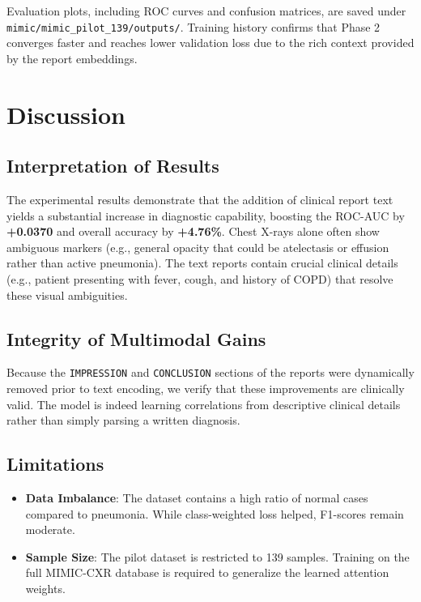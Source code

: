\documentclass[11pt,a4paper]{article}
\begin{document}
Evaluation plots, including ROC curves and confusion matrices, are saved under \texttt{mimic/mimic\_pilot\_139/outputs/}. Training history confirms that Phase 2 converges faster and reaches lower validation loss due to the rich context provided by the report embeddings.

\section{Discussion} \label{sec:discussion}

\subsection{Interpretation of Results}
The experimental results demonstrate that the addition of clinical report text yields a substantial increase in diagnostic capability, boosting the ROC-AUC by \textbf{+0.0370} and overall accuracy by \textbf{+4.76\%}. Chest X-rays alone often show ambiguous markers (e.g., general opacity that could be atelectasis or effusion rather than active pneumonia). The text reports contain crucial clinical details (e.g., patient presenting with fever, cough, and history of COPD) that resolve these visual ambiguities.

\subsection{Integrity of Multimodal Gains}
Because the \texttt{IMPRESSION} and \texttt{CONCLUSION} sections of the reports were dynamically removed prior to text encoding, we verify that these improvements are clinically valid. The model is indeed learning correlations from descriptive clinical details rather than simply parsing a written diagnosis.

\subsection{Limitations}
\begin{itemize}
    \item \textbf{Data Imbalance}: The dataset contains a high ratio of normal cases compared to pneumonia. While class-weighted loss helped, F1-scores remain moderate.
    \item \textbf{Sample Size}: The pilot dataset is restricted to 139 samples. Training on the full MIMIC-CXR database is required to generalize the learned attention weights.
\end{itemize}
\end{document}
